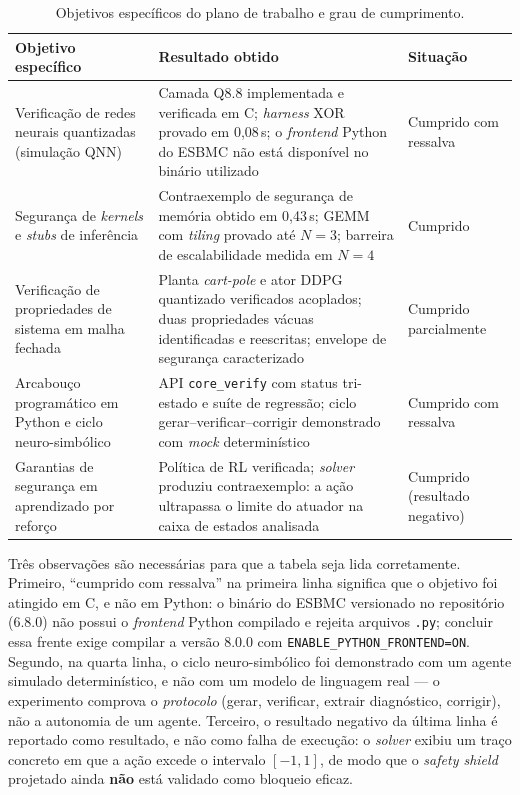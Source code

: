 \begin{table}[H]
\centering
\caption{Objetivos específicos do plano de trabalho e grau de cumprimento.}
\label{tab:objetivos}
\small
\begin{tabular}{@{}p{4.3cm}p{7.1cm}p{2.5cm}@{}}
\toprule
\textbf{Objetivo específico} & \textbf{Resultado obtido} & \textbf{Situação} \\
\midrule
Verificação de redes neurais quantizadas (simulação QNN) &
Camada Q8.8 implementada e verificada em C; \textit{harness} XOR provado em 0,08\,s;
o \textit{frontend} Python do ESBMC não está disponível no binário utilizado &
Cumprido com ressalva \\
\addlinespace
Segurança de \textit{kernels} e \textit{stubs} de inferência &
Contraexemplo de segurança de memória obtido em 0,43\,s; GEMM com \textit{tiling}
provado até $N{=}3$; barreira de escalabilidade medida em $N{=}4$ &
Cumprido \\
\addlinespace
Verificação de propriedades de sistema em malha fechada &
Planta \textit{cart-pole} e ator DDPG quantizado verificados acoplados; duas
propriedades vácuas identificadas e reescritas; envelope de segurança caracterizado &
Cumprido parcialmente \\
\addlinespace
Arcabouço programático em Python e ciclo neuro-simbólico &
API \texttt{core\_verify} com status tri-estado e suíte de regressão; ciclo
gerar--verificar--corrigir demonstrado com \textit{mock} determinístico &
Cumprido com ressalva \\
\addlinespace
Garantias de segurança em aprendizado por reforço &
Política de RL verificada; \textit{solver} produziu contraexemplo: a ação
ultrapassa o limite do atuador na caixa de estados analisada &
Cumprido (resultado negativo) \\
\bottomrule
\end{tabular}
\end{table}

Três observações são necessárias para que a tabela seja lida corretamente. Primeiro,
``cumprido com ressalva'' na primeira linha significa que o objetivo foi atingido em C, e
não em Python: o binário do ESBMC versionado no repositório (6.8.0) não possui o
\textit{frontend} Python compilado e rejeita arquivos \texttt{.py}; concluir essa frente
exige compilar a versão 8.0.0 com \texttt{ENABLE\_PYTHON\_FRONTEND=ON}. Segundo, na quarta
linha, o ciclo neuro-simbólico foi demonstrado com um agente simulado determinístico, e não
com um modelo de linguagem real --- o experimento comprova o \emph{protocolo}
(gerar, verificar, extrair diagnóstico, corrigir), não a autonomia de um agente. Terceiro, o
resultado negativo da última linha é reportado como resultado, e não como falha de
execução: o \textit{solver} exibiu um traço concreto em que a ação excede o intervalo
$[-1,1]$, de modo que o \textit{safety shield} projetado ainda \textbf{não} está validado
como bloqueio eficaz.
